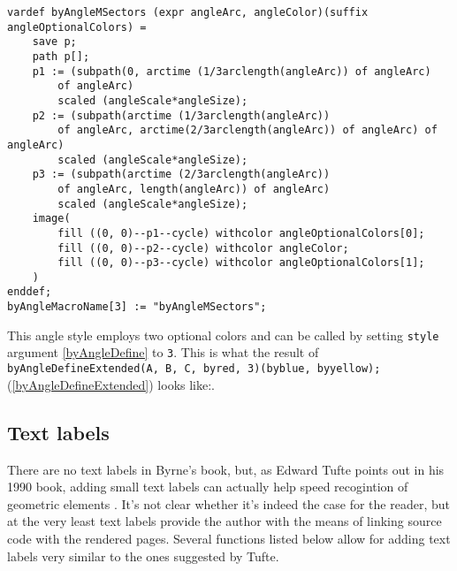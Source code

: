 \begin{lstlisting}	
vardef byAngleMSectors (expr angleArc, angleColor)(suffix angleOptionalColors) =
    save p;
    path p[];
    p1 := (subpath(0, arctime (1/3arclength(angleArc)) of angleArc) 
    	of angleArc) 
    	scaled (angleScale*angleSize);
    p2 := (subpath(arctime (1/3arclength(angleArc)) 
    	of angleArc, arctime(2/3arclength(angleArc)) of angleArc) of angleArc) 
    	scaled (angleScale*angleSize);
    p3 := (subpath(arctime (2/3arclength(angleArc)) 
    	of angleArc, length(angleArc)) of angleArc) 
    	scaled (angleScale*angleSize);
    image(
        fill ((0, 0)--p1--cycle) withcolor angleOptionalColors[0];
        fill ((0, 0)--p2--cycle) withcolor angleColor;
        fill ((0, 0)--p3--cycle) withcolor angleOptionalColors[1];
    )
enddef;
byAngleMacroName[3] := "byAngleMSectors";
\end{lstlisting}

This angle style employs two optional colors and can be called by setting \texttt{style} argument \ref{byAngleDefine} to \texttt{3}. This is what the result of \texttt{byAngleDefineExtended(A, B, C, byred, 3)(byblue, byyellow);} (\ref{byAngleDefineExtended}) looks like:.






\subsection{Text labels}

There are no text labels in Byrne's book, but, as Edward Tufte points out in his 1990 book, adding small text labels can actually help speed recogintion of geometric elements \cite{Tufte90}. It's not clear whether it's indeed the case for the reader, but at the very least text labels provide the author with the means of linking source code with the rendered pages. Several functions listed below allow for adding text labels very similar to the ones suggested by Tufte.

